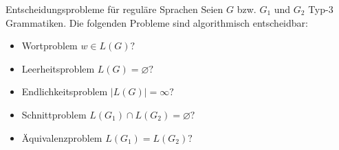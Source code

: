 \begin{frame}{Entscheidungsprobleme für reguläre Sprachen}
	Seien $G$ bzw. $G_1$ und $G_2$ Typ-3 Grammatiken. Die folgenden
	Probleme sind algorithmisch entscheidbar:
	\begin{itemize}
		\item Wortproblem $w \in L(G)?$
		\item Leerheitsproblem $L(G) = \varnothing?$
		\item Endlichkeitsproblem $|L(G)|=\infty ?$
		\item Schnittproblem $L(G_1) \cap L(G_2) = \varnothing ?$
		\item Äquivalenzproblem $L(G_1) = L(G_2)?$
	\end{itemize}
\end{frame}
